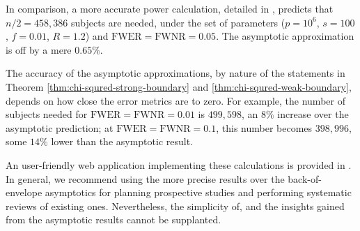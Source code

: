 In comparison, a more accurate power calculation, detailed in \cite{gao2019upass}, predicts that $n / 2 = 458,386$ subjects are needed, under the set of parameters ($p=10^6$, $s=100$, $f=0.01$, $R=1.2$) and $\mathrm{FWER}=\mathrm{FWNR}=0.05$.
The asymptotic approximation is off by a mere $0.65\%$.

The accuracy of the asymptotic approximations, by nature of the statements in Theorem \ref{thm:chi-squred-strong-boundary} and \ref{thm:chi-squred-weak-boundary}, depends on how close the error metrics are to zero.
For example, the number of subjects needed for $\mathrm{FWER}=\mathrm{FWNR}=0.01$ is $499,598$, an $8\%$ increase over the asymptotic prediction; at $\mathrm{FWER}=\mathrm{FWNR}=0.1$, this number becomes $398,996$, some $14\%$ lower than the asymptotic result.

An user-friendly web application implementing these calculations is provided in \cite{gao2019upass}.
In general, we recommend using the more precise results over the back-of-envelope asymptotics for planning prospective studies and performing systematic reviews of existing ones.
Nevertheless, the simplicity of, and the insights gained from the asymptotic results cannot be supplanted.
